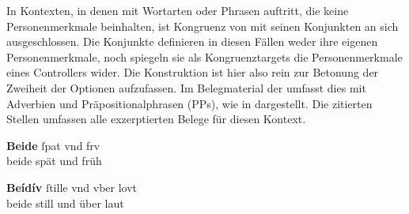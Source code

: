 In Kontexten, in denen  mit Wortarten oder Phrasen
auftritt, die keine Personenmerkmale beinhalten, ist Kongruenz von
 mit seinen Konjunkten an sich ausgeschlossen. Die Konjunkte
definieren in diesen Fällen weder ihre eigenen Personen\-merkmale, noch
spiegeln sie als Kongruenztargets die Personenmerkmale eines Controllers wider.
Die Konstruktion ist hier also rein zur Betonung der Zweiheit der Optionen
aufzufassen. Im Belegmaterial der \citet{kc} umfasst dies  mit Adverbien und Präpositionalphrasen (PPs), wie in
 dargestellt. Die zitierten Stellen
umfassen alle exzerptierten Belege für diesen Kontext.

\begin{exe}
\ex \label{ex:syntintvar1}
	\begin{xlist}
	\ex \begin{taggedline}{\parencites[\pno~18\rb, 5]{kc:B1}[vgl.~abweichend][6289]{schroeder1895}}
	\end{taggedline}

	\ex \begin{taggedline}{\parencites[\pno~19\va, 15]{kc:B1}[zu][6834--6839]{schroeder1895}}
	\end{taggedline}

	\ex \label{ex:syntintvar1_3}
	\gll \textbf{Beide} ſpat vnd frv \\
		beide spät und früh \\
	\begin{taggedline}{\parencites[\pno~33\ra, 36]{kc:VB}[zu][6834--6839]{schroeder1895}}
	\trans {}
	\end{taggedline}
\end{xlist}

\ex \label{ex:syntintvar3}
	\begin{xlist}
	\ex \begin{taggedline}{\parencites[\pno~22\va, 1]{kc:B1}[zu][8014--8020]{schroeder1895}}
	\end{taggedline}

	\ex \label{ex:syntintvar3_2}
		\gll \textbf{Beídív} ſtille vnd vber lovt \\
		beide still und über laut \\
	\begin{taggedline}{\parencites[\pno~38\vb, 24]{kc:VB}[zu][8014--8020]{schroeder1895}}
	\trans {}
	\end{taggedline}
\end{xlist}
\end{exe}

